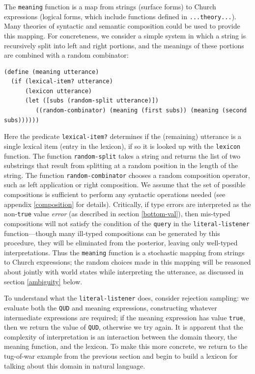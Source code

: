 \documentclass[pdfextras]{handbook}
\begin{document}
The \lstinline{meaning} function is a map from strings (surface forms) to Church expressions (logical forms, which include functions defined in \lstinline{...theory...}).
Many theories of syntactic and semantic composition could be used to provide this mapping. 
For concreteness, we consider a simple system in which a string is recursively split into left and right portions, and the meanings of these portions are combined with a random combinator:
\begin{lstlisting}
(define (meaning utterance)
  (if (lexical-item? utterance)
      (lexicon utterance)
      (let ([subs (random-split utterance)])
         ((random-combinator) (meaning (first subs)) (meaning (second subs))))))
\end{lstlisting}
Here the predicate \lstinline{lexical-item?} determines if the (remaining) utterance is a single lexical item (entry in the lexicon), if so it is looked up with the \lstinline{lexicon} function.
The function \lstinline{random-split} takes a string and returns the list of two substrings that result from splitting at a random position in the length of the string.
The function \lstinline{random-combinator} chooses a random composition operator, such as left application or right composition. 
We assume that the set of possible compositions is sufficient to perform any syntactic operations needed (see appendix \ref{composition} for details).
Critically, if type errors are interpreted as the non-\lstinline{true} value \emph{error} (as described in section \ref{bottom-val}), then mis-typed compositions will not satisfy the condition of the \lstinline{query} in the \lstinline{literal-listener} function---though many ill-typed compositions can be generated by this procedure, they will be eliminated from the posterior, leaving only well-typed interpretations.
Thus the \lstinline{meaning} function is a stochastic mapping from strings to Church expressions; the random choices made in this mapping will be reasoned about jointly with world states while interpreting the utterance, as discussed in section \ref{ambiguity} below.

To understand what the \lstinline{literal-listener} does, consider rejection sampling: we evaluate both the \lstinline{QUD} and meaning expressions, constructing whatever intermediate expressions are required; if the meaning expression has value \lstinline{true}, then we return the value of \lstinline{QUD}, otherwise we try again. 
It is apparent that the complexity of interpretation is an interaction between the domain theory, the meaning function, and the lexicon. 
To make this more concrete, we return to the tug-of-war example from the previous section and begin to build a lexicon for talking about this domain in natural language. 
\end{document}
